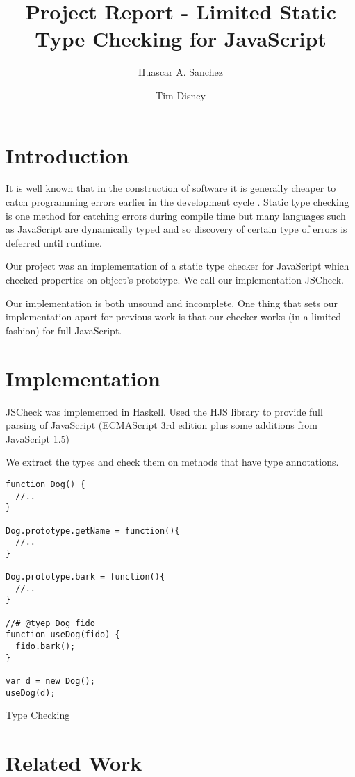 \documentclass{article}
\begin{document}
\title{Project Report - Limited Static Type Checking for JavaScript}
\author{Huascar A. Sanchez \and Tim Disney}

\maketitle

\lstset{showstringspaces=false}

\section{Introduction}
It is well known that in the construction of software it is generally 
cheaper to catch programming errors earlier in the development cycle \cite{cc2}.
Static type checking is one method for catching errors during compile time
but many languages such as JavaScript are dynamically typed and so discovery
of certain type of errors is deferred until runtime.

Our project was an implementation of a static type checker for JavaScript which
checked properties on object's prototype. We call our implementation JSCheck.

Our implementation is both unsound and incomplete. One thing that sets our 
implementation apart for previous work is that our checker works (in a limited fashion) for
full JavaScript.

\section{Implementation}
JSCheck was implemented in Haskell. Used the HJS library to provide full
parsing of JavaScript (ECMAScript 3rd edition plus some additions from JavaScript 1.5)

We extract the types and check them on methods that have type annotations.
\begin{program}
\begin{verbatim}
function Dog() {
  //..
}

Dog.prototype.getName = function(){
  //..
}

Dog.prototype.bark = function(){
  //..
}

//# @tyep Dog fido
function useDog(fido) {
  fido.bark();
}

var d = new Dog();
useDog(d);
\end{verbatim}
\caption{Type Checking}
\end{program}

\section{Related Work}
\end{document}
